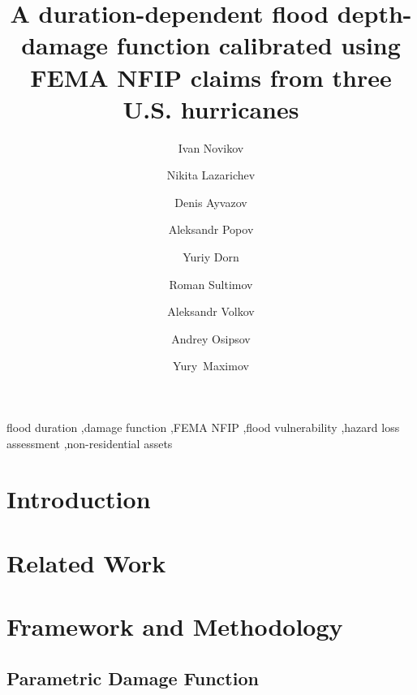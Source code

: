 \documentclass[preprint,12pt,authoryear]{elsarticle}
\begin{document}
\begin{frontmatter}

\title{A duration-dependent flood depth-damage function calibrated using FEMA NFIP claims from three U.S. hurricanes}

\author[airi]{Ivan Novikov}
\author[airi]{Nikita Lazarichev}
\author[airi]{Denis Ayvazov}
\author[airi]{Aleksandr Popov}
\author[msu]{Yuriy Dorn}
\author[msu]{Roman Sultimov}
\author[interdata]{Aleksandr Volkov}
\author[msu]{Andrey Osipsov}
\author[interdata]{Yury~Maximov}


\address[airi]{Moscow Research Institute of Artificial Intelligence, Moscow, Russia}
\address[msu]{Moscow State University, Moscow, Russia}
\address[interdata]{Interdata, Astana, Kazakhstan}

\begin{abstract}

\end{abstract}

\begin{keyword}
flood duration \sep damage function \sep FEMA NFIP \sep flood vulnerability \sep hazard loss assessment \sep non-residential assets
\end{keyword}

\end{frontmatter}

\linenumbers



\section{Introduction}
\label{sec: intro}


\section{Related Work}
\label{sec: lit review}




\section{Framework and Methodology}
\label{sec: methods}


\subsection{Parametric Damage Function} \label{ssec: damage function}

\end{document}
